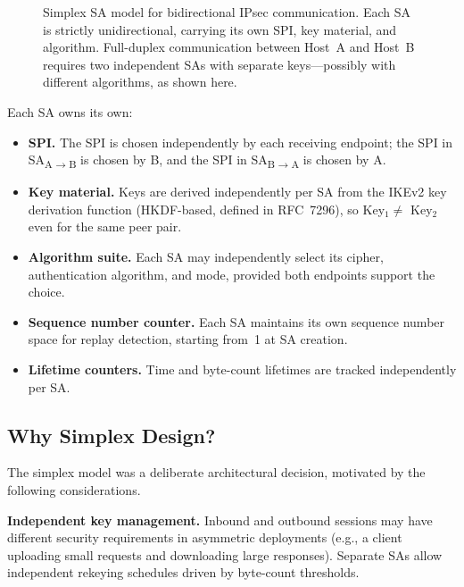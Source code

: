 \documentclass[sigconf,nonacm]{acmart}
\begin{document}
\begin{figure}[t]
\caption{Simplex SA model for bidirectional IPsec communication. Each SA is strictly
  unidirectional, carrying its own SPI, key material, and algorithm. Full-duplex
  communication between Host~A and Host~B requires two independent SAs with separate
  keys---possibly with different algorithms, as shown here.}
\label{fig:simplex}
\end{figure}

Each SA owns its own:
\begin{itemize}
  \item \textbf{SPI.} The SPI is chosen independently by each receiving endpoint;
        the SPI in SA\textsubscript{A$\to$B} is chosen by B, and the SPI in
        SA\textsubscript{B$\to$A} is chosen by A.
  \item \textbf{Key material.} Keys are derived independently per SA from the IKEv2
        key derivation function (HKDF-based, defined in RFC~7296), so
        Key$_1 \neq$ Key$_2$ even for the same peer pair.
  \item \textbf{Algorithm suite.} Each SA may independently select its cipher,
        authentication algorithm, and mode, provided both endpoints support the choice.
  \item \textbf{Sequence number counter.} Each SA maintains its own sequence number
        space for replay detection, starting from~1 at SA creation.
  \item \textbf{Lifetime counters.} Time and byte-count lifetimes are tracked
        independently per SA.
\end{itemize}

\subsection{Why Simplex Design?}

The simplex model was a deliberate architectural decision, motivated by the following
considerations.

\textbf{Independent key management.} Inbound and outbound sessions may have different
security requirements in asymmetric deployments (e.g., a client uploading small
requests and downloading large responses). Separate SAs allow independent rekeying
schedules driven by byte-count thresholds.
\end{document}

